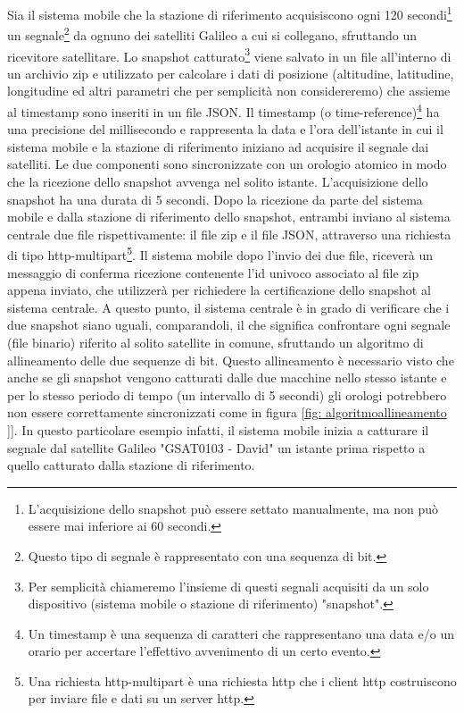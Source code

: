 Sia il sistema mobile che la stazione di riferimento acquisiscono ogni 120 secondi\footnote{L'acquisizione dello snapshot può essere settato manualmente, ma non può essere mai inferiore ai 60 secondi.} un segnale\footnote{Questo tipo di segnale è rappresentato con una sequenza di bit.} da ognuno dei satelliti Galileo a cui si collegano, sfruttando un ricevitore satellitare. Lo snapshot catturato\footnote{Per semplicità chiameremo l'insieme di questi segnali acquisiti da un solo dispositivo (sistema mobile o stazione di riferimento) "snapshot".} viene salvato in un file all'interno di un archivio zip e utilizzato per calcolare i dati di posizione (altitudine, latitudine, longitudine ed altri parametri che per semplicità non considereremo) che assieme al timestamp sono inseriti in un file JSON. Il timestamp (o time-reference)\footnote{Un timestamp è una sequenza di caratteri che rappresentano una data e/o un orario per accertare l’effettivo avvenimento di un certo evento.} ha una precisione del millisecondo e rappresenta la data e l'ora dell'istante in cui il sistema mobile e la stazione di riferimento iniziano ad acquisire il segnale dai satelliti. Le due componenti sono sincronizzate con un orologio atomico in modo che la ricezione dello snapshot avvenga nel solito istante. L'acquisizione dello snapshot ha una durata di 5 secondi. Dopo la ricezione da parte del sistema mobile e dalla stazione di riferimento dello snapshot, entrambi inviano al sistema centrale due file rispettivamente: il file zip e il file JSON, attraverso una richiesta di tipo http-multipart\footnote{Una richiesta http-multipart è una richiesta http che i client http costruiscono per inviare file e dati su un server http.}. Il sistema mobile dopo l'invio dei due file, riceverà un messaggio di conferma ricezione contenente l'id univoco associato al file zip appena inviato, che utilizzerà per richiedere la certificazione dello snapshot al sistema centrale. A questo punto, il sistema centrale è in grado di verificare che i due snapshot siano uguali, comparandoli, il che significa confrontare ogni segnale (file binario) riferito al solito satellite in comune, sfruttando un algoritmo di allineamento delle due sequenze di bit. Questo allineamento è necessario visto che anche se gli snapshot vengono catturati dalle due macchine nello stesso istante e per lo stesso periodo di tempo (un intervallo di 5 secondi) gli orologi potrebbero non essere correttamente sincronizzati come in figura \ref{fig: algoritmoallineamento }]. In questo particolare esempio infatti, il sistema mobile inizia a catturare il segnale dal satellite Galileo "GSAT0103 - David" un istante prima rispetto a quello catturato dalla stazione di riferimento.
